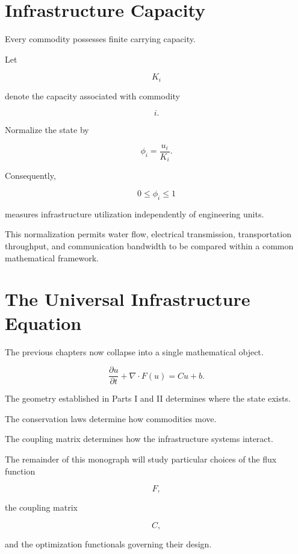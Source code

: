 \documentclass[11pt,fleqn]{book}
\numberwithin{equation}{chapter}
\theoremstyle{plain}
\theoremstyle{definition}
\theoremstyle{remark}
\begin{document}

\section{Infrastructure Capacity}

Every commodity possesses finite carrying capacity.

Let

\[
K_i
\]

denote the capacity associated with commodity

\[
i.
\]

Normalize the state by

\[
\phi_i
=
\frac{u_i}{K_i}.
\]

Consequently,

\[
0
\le
\phi_i
\le
1
\]

measures infrastructure utilization independently of engineering units.

This normalization permits water flow, electrical transmission,
transportation throughput, and communication bandwidth to be compared
within a common mathematical framework.


\section{The Universal Infrastructure Equation}

The previous chapters now collapse into a single mathematical object.

\[
\boxed{
\frac{\partial u}{\partial t}
+
\nabla\cdot F(u)
=
Cu+b.
}
\]

The geometry established in Parts I and II determines where the state
exists.

The conservation laws determine how commodities move.

The coupling matrix determines how the infrastructure systems interact.

The remainder of this monograph will study particular choices of the
flux function

\[
F,
\]

the coupling matrix

\[
C,
\]

and the optimization functionals governing their design.

\end{document}
